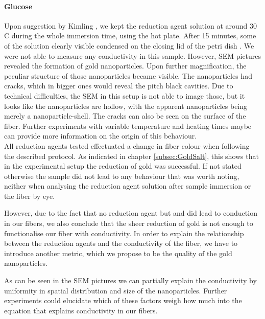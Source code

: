 

\paragraph{Glucose}
Upon suggestion by Kimling \cite{Kimling}, we kept the reduction agent solution at around 30 \degree C during the whole immersion time, using the hot plate. After 15 minutes, some of the solution clearly visible condensed on the closing lid of the petri dish . We were not able to measure any conductivity in this sample. However, SEM pictures revealed the formation of gold nanoparticles. Upon further magnification, the peculiar structure of those nanoparticles became visible. The nanoparticles had cracks, which in bigger ones would reveal the pitch black cavities. Due to technical difficulties, the SEM in this setup is not able to image those, but it looks like the nanoparticles are hollow, with the apparent nanoparticles being merely a nanoparticle-shell. The cracks can also be seen on the surface of the fiber. Further experiments with variable temperature and heating times maybe can provide more information on the origin of this behaviour.\\


All reduction agents tested effectuated a change in fiber colour when following the described protocol. As indicated in chapter \ref{subsec:GoldSalt}, this shows that in the experimental setup the reduction of gold was successful. If not stated otherwise the sample did not lead to any behaviour that was worth noting, neither when analysing the reduction agent solution after sample immersion or the fiber by eye.

However, due to the fact that no reduction agent but  and  did lead to conduction in our fibers, we also conclude that the sheer reduction of gold is not enough to functionalise our fiber with conductivity. In order to explain the relationship between the reduction agents and the conductivity of the fiber, we have to introduce another metric, which we propose to be the quality of the gold nanoparticles.


As can be seen in the SEM pictures  we can partially explain the conductivity by uniformity in spatial distribution and size of the nanoparticles. Further experiments could elucidate which of these factors weigh how much into the equation that explains conductivity in our fibers. 

